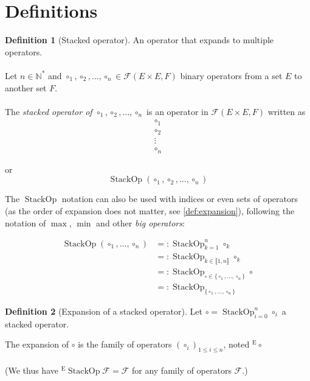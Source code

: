 \documentclass{article}
\newcommand{\fc}{\mathcal{F}}
\DeclareMathOperator*{\stackop}{StackOp}
\theoremstyle{definition}
\newtheorem{definition}{Definition}
\begin{document}
\section{Definitions}

\begin{definition}[Stacked operator]
	An operator that expands to multiple operators.
	\paragraph{}
	Let $n\in \mathbb{N}^\ast$ and $\circ_1, \circ_2, \ldots, \circ_n \in \fc(E \times E, F)$ binary operators  from a set $E$ to another set $F$.

	\paragraph{}
	The \emph{stacked operator of $\circ_1, \circ_2, \ldots, \circ_n$} is an operator in $\fc(E \times E, F)$ written as
	\[
		\begin{matrix} \circ_1 \\ \circ_2 \\ \vdots \\ \circ_n \end{matrix} 
	\] 

	or \[
		\stackop(\circ_1, \circ_2, \ldots, \circ_n)
	\] 

	The $\stackop$ notation can also be used with indices or even sets of operators (as the order of expansion does not matter, see \ref{def:expansion}), following the notation of $\max$,  $\min$ and other  \emph{big operators}:

	\begin{align*}
		\stackop\left( \circ_1, \ldots, \circ_n \right) &=:  \stackop_{k=1}^n \circ_k \\
					&=: \stackop_{k\in \llbracket 1, n\rrbracket} \circ_k \\
					&=: \stackop_{\circ \in \{\circ_1, \ldots, \circ_n\} } \circ  \\
					&=: \stackop_{ \{\circ_1, \ldots, \circ_n\}  }
	\end{align*}
\end{definition}

\begin{definition}[Expansion of a stacked operator]
	Let $\circ = \stackop_{i=0}^n \circ_i$ a stacked operator.

	The expansion of $\circ$ is the family of operators  $(\circ_i)_{1\le i\le n}$, noted ${}^\text{E}\circ$
	
	\paragraph{}
	(We thus have ${}^\text{E}{\stackop} \fc = \fc$ for any family of operators $\fc$.)
\end{definition}
\end{document}
